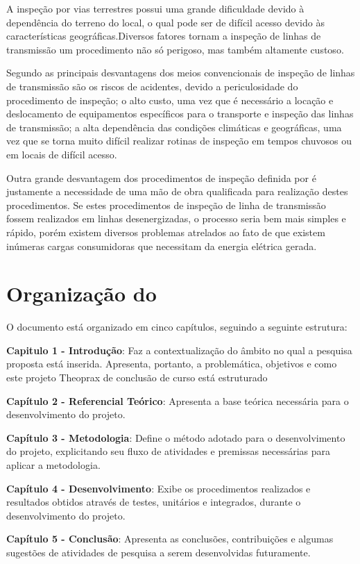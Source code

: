  A inspeção por vias terrestres possui uma grande dificuldade devido à dependência do terreno do local, o qual pode ser de difícil acesso devido às características geográficas.Diversos fatores tornam a inspeção de linhas de transmissão um procedimento não só perigoso, mas também altamente custoso. 
 
 Segundo \cite{cinematicajuliana} as principais desvantagens dos meios convencionais de inspeção de linhas de transmissão são os riscos de acidentes, devido a periculosidade do procedimento de inspeção; o alto custo, uma vez que é necessário a locação e deslocamento de equipamentos específicos para o transporte e inspeção das linhas de transmissão; a alta dependência das condições climáticas e geográficas, uma vez que se torna muito difícil realizar rotinas de inspeção em tempos chuvosos ou em locais de difícil acesso.
 
 Outra grande desvantagem dos procedimentos de inspeção definida por \cite{cinematicajuliana} é justamente a necessidade de uma mão de obra qualificada para realização destes procedimentos. Se estes procedimentos de inspeção de linha de transmissão fossem realizados em linhas desenergizadas, o processo seria bem mais simples e rápido, porém existem diversos problemas atrelados ao fato de que existem inúmeras cargas consumidoras que necessitam da energia elétrica gerada.


\section{Organização do \thetypework}
\label{section:organizacao}
O documento está organizado em cinco capítulos, seguindo a seguinte estrutura:

\textbf{Capitulo 1 - Introdução}: Faz a contextualização do âmbito no qual a pesquisa proposta
está inserida. Apresenta, portanto, a problemática, objetivos e como este projeto Theoprax de conclusão de curso está estruturado


\textbf{Capítulo 2 - Referencial Teórico}: Apresenta a base teórica necessária para o desenvolvimento do projeto.

\textbf{Capítulo 3 - Metodologia}: Define o método adotado para o desenvolvimento do projeto, explicitando seu fluxo de atividades e premissas necessárias para aplicar a metodologia.

\textbf{Capítulo 4 - Desenvolvimento}: Exibe os procedimentos realizados e resultados obtidos através de testes, unitários e integrados, durante o desenvolvimento do projeto.

\textbf{Capítulo 5 - Conclusão}: Apresenta as conclusões, contribuições e algumas sugestões de atividades de pesquisa a serem desenvolvidas futuramente.


